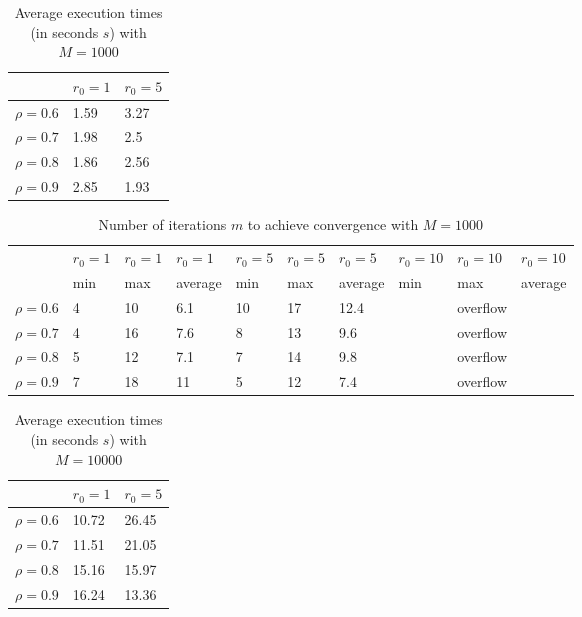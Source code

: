 \documentclass[a4paper,11pt,openright]{report}
\begin{document}
\begin{table}[H]
\centering
\addtolength{\leftskip}{-1.5cm}
\addtolength{\rightskip}{-1.5cm}
\begin{tabular}{|c|ll|}
\hline
$ $ & $r_0 = 1$ & $r_0 = 5$  \\
\hline
$\rho = 0.6$ & 1.59 & 3.27  \\

$\rho = 0.7$ & 1.98 & 2.5  \\

$\rho = 0.8$ & 1.86 & 2.56  \\

$\rho = 0.9$ & 2.85 & 1.93  \\
\hline
\end{tabular}
\caption{Average execution
 times (in seconds $s$) with $M = 1000$}
\end{table}
\begin{table}[H]
\centering
\addtolength{\leftskip}{-1.5cm}
\addtolength{\rightskip}{-1.5cm}
\begin{tabular}{|c|lllllllll|}
\hline
$ $ & $r_0 = 1$ & $r_0 = 1$ & $r_0 = 1$ & $r_0 = 5$ & $r_0 = 5$ & $r_0 = 5$ & $r_0 = 10$ & $r_0 = 10$ & $r_0 = 10$  \\
$ $ & min & max & average & min & max & average & min & max & average \\ 
\hline
$\rho = 0.6$ & 4 & 10 & 6.1 & 10 & 17 & 12.4 &  & overflow &  \\

$\rho = 0.7$ & 4 & 16 & 7.6 & 8 & 13 & 9.6 &  & overflow &  \\

$\rho = 0.8$ & 5 & 12 & 7.1 & 7 & 14 & 9.8 &  & overflow & \\

$\rho = 0.9$ & 7 & 18 & 11 & 5 & 12 & 7.4 &  & overflow & \\
\hline
\end{tabular}
\caption{Number of iterations $m$ to achieve convergence with $M = 1000$}
\end{table}
\begin{table}[H]
\centering
\addtolength{\leftskip}{-1.5cm}
\addtolength{\rightskip}{-1.5cm}
\begin{tabular}{|c|ll|}
\hline
$ $ & $r_0 = 1$ & $r_0 = 5$  \\
\hline
$\rho = 0.6$ & 10.72 & 26.45 \\

$\rho = 0.7$ & 11.51 & 21.05 \\

$\rho = 0.8$ & 15.16 & 15.97  \\

$\rho = 0.9$ & 16.24 & 13.36  \\
\hline
\end{tabular}
\caption{Average execution
 times (in seconds $s$) with $M = 10000$}
\end{table}
\end{document}
